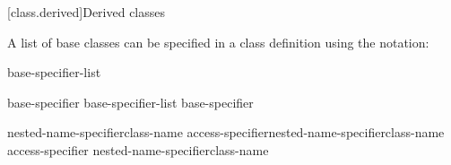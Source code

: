 [class.derived]{Derived classes}%



\pnum
{}%
%
%
A list of base classes can be specified in a class definition using
the notation:

\begin{bnf}
\br
    \terminal{:} base-specifier-list
\end{bnf}


\begin{bnf}
\br
    base-specifier\br
    base-specifier-list \terminal{,} base-specifier
\end{bnf}

\begin{bnf}
\br
    \terminal{::}\opt nested-name-specifier\opt class-name\br
     access-specifier\opt \terminal{::}\opt nested-name-specifier\opt class-name\br
    access-specifier \opt \terminal{::}\opt nested-name-specifier\opt class-name
\end{bnf}

%
%
\begin{bnf}
\br
    \br
    \br
\end{bnf}

